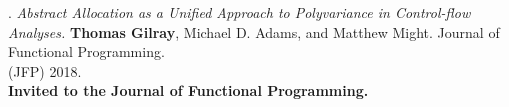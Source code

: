 \paper. \textit{Abstract Allocation as a Unified Approach to Polyvariance in Control-flow Analyses.}
\textbf{Thomas Gilray}, Michael D. Adams, and Matthew Might.
Journal of Functional Programming.
\\(JFP) 2018. 
\\\textbf{Invited to the Journal of Functional Programming.} \\ \vspace{-0.1cm}\\
